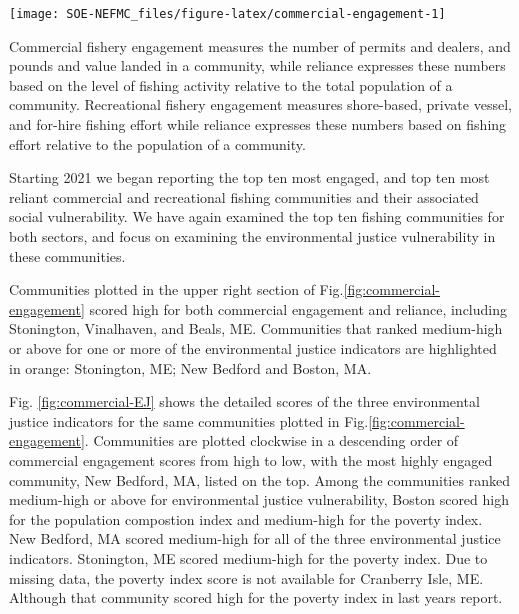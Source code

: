 \documentclass[
  10pt,
]{article}
\let\origfigure\figure
\let\endorigfigure\endfigure
\renewenvironment{figure}[1][2] {
    \expandafter\origfigure\expandafter[H]
} {
    \endorigfigure
}
\begin{document}
\begin{figure}

{\centering \texttt{[image: SOE-NEFMC\_files/figure-latex/commercial-engagement-1]} 

}

\caption{Commercial engagement, reliance, and environmental justice vulnerability for the top commercially engaged and reliant fishing communities in New England.  Communities ranked medium-high or above for one or more of the environmental justice indicators are highlighted in orange. *Community scored high (1.00 and above) for both commercial engagement and reliance indicators.}\label{fig:commercial-engagement}
\end{figure}

Commercial fishery engagement measures the number of permits and dealers, and pounds and value landed in a community, while reliance expresses these numbers based on the level of fishing activity relative to the total population of a community. Recreational fishery engagement measures shore-based, private vessel, and for-hire fishing effort while reliance expresses these numbers based on fishing effort relative to the population of a community.

Starting 2021 we began reporting the top ten most engaged, and top ten most reliant commercial and recreational fishing communities and their associated social vulnerability. We have again examined the top ten fishing communities for both sectors, and focus on examining the environmental justice vulnerability in these communities.

Communities plotted in the upper right section of Fig.\ref{fig:commercial-engagement} scored high for both commercial engagement and reliance, including Stonington, Vinalhaven, and Beals, ME. Communities that ranked medium-high or above for one or more of the environmental justice indicators are highlighted in orange: Stonington, ME; New Bedford and Boston, MA.

Fig. \ref{fig:commercial-EJ} shows the detailed scores of the three environmental justice indicators for the same communities plotted in Fig.\ref{fig:commercial-engagement}. Communities are plotted clockwise in a descending order of commercial engagement scores from high to low, with the most highly engaged community, New Bedford, MA, listed on the top. Among the communities ranked medium-high or above for environmental justice vulnerability, Boston scored high for the population compostion index and medium-high for the poverty index. New Bedford, MA scored medium-high for all of the three environmental justice indicators. Stonington, ME scored medium-high for the poverty index. Due to missing data, the poverty index score is not available for Cranberry Isle, ME. Although that community scored high for the poverty index in last years report.
\end{document}
